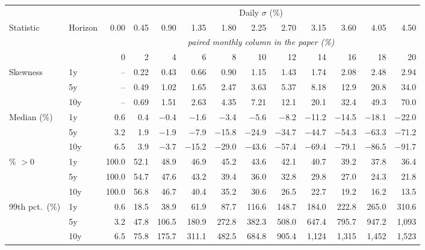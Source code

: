 \begin{tabular}{@{}llrrrrrrrrrrr@{}}
\toprule
 & & \multicolumn{11}{c}{Daily $\sigma$ (\%)} \\ \cmidrule(l){3-13}
Statistic & Horizon & 0.00 & 0.45 & 0.90 & 1.35 & 1.80 & 2.25 & 2.70 & 3.15 & 3.60 & 4.05 & 4.50 \\
& & \multicolumn{11}{c}{\textit{paired monthly column in the paper (\%)}} \\
& & 0 & 2 & 4 & 6 & 8 & 10 & 12 & 14 & 16 & 18 & 20 \\ \midrule
Skewness & 1y & -- & 0.22 & 0.43 & 0.66 & 0.90 & 1.15 & 1.43 & 1.74 & 2.08 & 2.48 & 2.94 \\
 & 5y & -- & 0.49 & 1.02 & 1.65 & 2.47 & 3.63 & 5.37 & 8.18 & 12.9 & 20.8 & 34.0 \\
 & 10y & -- & 0.69 & 1.51 & 2.63 & 4.35 & 7.21 & 12.1 & 20.1 & 32.4 & 49.3 & 70.0 \\
\addlinespace
Median (\%) & 1y & 0.6 & 0.4 & $-$0.4 & $-$1.6 & $-$3.4 & $-$5.6 & $-$8.2 & $-$11.2 & $-$14.5 & $-$18.1 & $-$22.0 \\
 & 5y & 3.2 & 1.9 & $-$1.9 & $-$7.9 & $-$15.8 & $-$24.9 & $-$34.7 & $-$44.7 & $-$54.3 & $-$63.3 & $-$71.2 \\
 & 10y & 6.5 & 3.9 & $-$3.7 & $-$15.2 & $-$29.0 & $-$43.6 & $-$57.4 & $-$69.4 & $-$79.1 & $-$86.5 & $-$91.7 \\
\addlinespace
\% $>0$ & 1y & 100.0 & 52.1 & 48.9 & 46.9 & 45.2 & 43.6 & 42.1 & 40.7 & 39.2 & 37.8 & 36.4 \\
 & 5y & 100.0 & 54.7 & 47.6 & 43.2 & 39.4 & 36.0 & 32.8 & 29.8 & 27.0 & 24.3 & 21.8 \\
 & 10y & 100.0 & 56.8 & 46.7 & 40.4 & 35.2 & 30.6 & 26.5 & 22.7 & 19.2 & 16.2 & 13.5 \\
\addlinespace
99th pct.\ (\%) & 1y & 0.6 & 18.5 & 38.9 & 61.9 & 87.7 & 116.6 & 148.7 & 184.0 & 222.8 & 265.0 & 310.6 \\
 & 5y & 3.2 & 47.8 & 106.5 & 180.9 & 272.8 & 382.3 & 508.0 & 647.4 & 795.7 & 947.2 & 1,093 \\
 & 10y & 6.5 & 75.8 & 175.7 & 311.1 & 482.5 & 684.8 & 905.4 & 1,124 & 1,315 & 1,452 & 1,523 \\
\bottomrule
\end{tabular}
